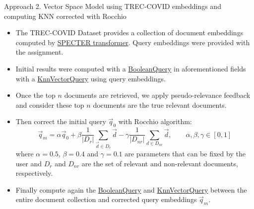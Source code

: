 \documentclass[10pt]{beamer}
\begin{document}
{\begin{frame}{Approach 2. Vector Space Model using TREC-COVID embeddings and computing KNN corrected with Rocchio \cite{salton1990improving}}
    \begin{itemize}
        \item The TREC-COVID Dataset provides a collection of document embeddings computed by \href{https://arxiv.org/abs/2004.07180}{SPECTER transformer}. Query embeddings were provided with the assignment. 
        \item Initial results were computed with a \href{https://lucene.apache.org/core/8_9_0/core/org/apache/lucene/search/BooleanQuery.html}{BooleanQuery} in aforementioned fields with a \href{https://lucene.apache.org/core/9_0_0/core/org/apache/lucene/search/KnnVectorQuery.html}{KnnVectorQuery} using query embeddings.
        \item Once the top $n$ documents are retrieved, we apply pseudo-relevance feedback and consider these top $n$ documents are the true relevant documents.
        \item Then correct the initial query $\vec{q}_0$ with Rocchio algorithm:
        \[ \vec{q}_m = \alpha \vec{q}_0 + \beta \frac{1}{|D_r|} \sum_{\vec{d}\in D_r}\vec{d} - \gamma \frac{1}{|D_{nr}|} \sum_{d\in D_{nr}} \vec{d}, \qquad \alpha, \beta, \gamma \in [0,1]\]
        where $\alpha=0.5$, $\beta=0.4$ and $\gamma=0.1$ are parameters that can be fixed by the user and $D_r$ and $D_{nr}$ are the set of relevant and non-relevant documents, respectively.
        \item Finally compute again the \href{https://lucene.apache.org/core/8_9_0/core/org/apache/lucene/search/BooleanQuery.html}{BooleanQuery} and \href{https://lucene.apache.org/core/9_0_0/core/org/apache/lucene/search/KnnVectorQuery.html}{KnnVectorQuery} between the entire document collection and corrected query embeddings $\vec{q}_m$.
    \end{itemize}
\end{frame}

}
\end{document}
